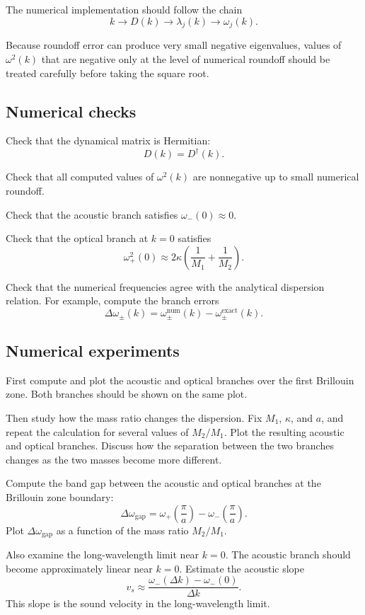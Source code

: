 The numerical implementation should follow the chain
\[
k
\longrightarrow
D(k)
\longrightarrow
\lambda_j(k)
\longrightarrow
\omega_j(k).
\]

Because roundoff error can produce very small negative eigenvalues, values of \(\omega^2(k)\) that are negative only at the level of numerical roundoff should be treated carefully before taking the square root.

\subsection{Numerical checks}

Check that the dynamical matrix is Hermitian:
\[
D(k)=D^\dagger(k).
\]

Check that all computed values of \(\omega^2(k)\) are nonnegative up to small numerical roundoff.

Check that the acoustic branch satisfies \(\omega_-(0)\approx0\).

Check that the optical branch at \(k=0\) satisfies
\[
\omega_+^2(0)
\approx
2\kappa
\left(
\frac{1}{M_1}
+
\frac{1}{M_2}
\right).
\]

Check that the numerical frequencies agree with the analytical dispersion relation. For example, compute the branch errors
\[
\Delta\omega_{\pm}(k)
=
\omega_{\pm}^{\mathrm{num}}(k)
-
\omega_{\pm}^{\mathrm{exact}}(k).
\]

\subsection{Numerical experiments}

First compute and plot the acoustic and optical branches over the first Brillouin zone. Both branches should be shown on the same plot.

Then study how the mass ratio changes the dispersion. Fix \(M_1\), \(\kappa\), and \(a\), and repeat the calculation for several values of \(M_2/M_1\). Plot the resulting acoustic and optical branches. Discuss how the separation between the two branches changes as the two masses become more different.

Compute the band gap between the acoustic and optical branches at the Brillouin zone boundary:
\[
\Delta\omega_{\mathrm{gap}}
=
\omega_+\left(\frac{\pi}{a}\right)
-
\omega_-\left(\frac{\pi}{a}\right).
\]
Plot \(\Delta\omega_{\mathrm{gap}}\) as a function of the mass ratio \(M_2/M_1\).

Also examine the long-wavelength limit near \(k=0\). The acoustic branch should become approximately linear near \(k=0\). Estimate the acoustic slope
\[
v_s
\approx
\frac{\omega_-(\Delta k)-\omega_-(0)}{\Delta k}.
\]
This slope is the sound velocity in the long-wavelength limit.

